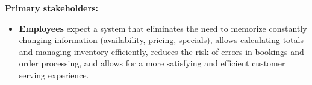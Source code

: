 \documentclass[]{VUMIFTemplateClass}
\newcommand{\warningcomment}[1]{%
    \begin{tcolorbox}[colback=yellow!90, colframe=red, arc=0pt, outer arc=0pt, boxrule=2pt, left=5pt, right=5pt, top=5pt, bottom=5pt]
        \Large\textbf{\textcolor{red}{FIX THIS: }} \normalsize #1
    \end{tcolorbox}
}
\begin{document}

\textbf{Primary stakeholders:}
\begin{itemize}
    \item \textbf{Employees} expect a system that eliminates the need to
    memorize constantly changing information (availability, pricing, specials),
    allows calculating totals and managing inventory efficiently, reduces the
    risk of errors in bookings and order processing, and allows for a more
    satisfying and efficient customer serving experience.
    

\end{itemize}
\end{document}
